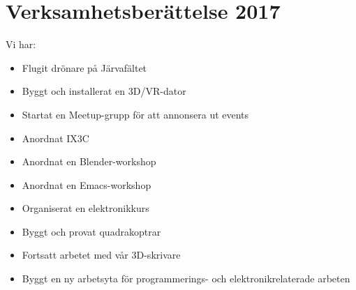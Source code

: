 \documentclass[a4paper,11pt,oneside]{article}
\begin{document}
\section{Verksamhetsberättelse 2017}

Vi har: \\
\begin{itemize}
\item Flugit drönare på Järvafältet
\item Byggt och installerat en 3D/VR-dator 
\item Startat en Meetup-grupp för att annonsera ut events
\item Anordnat IX3C
\item Anordnat en Blender-workshop
\item Anordnat en Emacs-workshop
\item Organiserat en elektronikkurs
\item Byggt och provat quadrakoptrar
\item Fortsatt arbetet med vår 3D-skrivare
\item Byggt en ny arbetsyta för programmerings- och elektronikrelaterade arbeten
\end{itemize}
\end{document}
